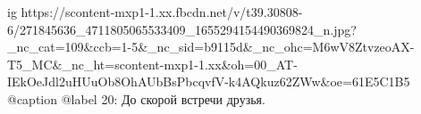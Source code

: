  
 
 
 
 

\ifcmt
  ig https://scontent-mxp1-1.xx.fbcdn.net/v/t39.30808-6/271845636_4711805065533409_1655294154490369824_n.jpg?_nc_cat=109&ccb=1-5&_nc_sid=b9115d&_nc_ohc=M6wV8ZtvzeoAX-T5_MC&_nc_ht=scontent-mxp1-1.xx&oh=00_AT-IEkOeJdl2uHUuOb8OhAUbBsPbcqvfV-k4AQkuz62ZWw&oe=61E5C1B5
  @caption @label 20: До скорой встречи друзья.
\fi
